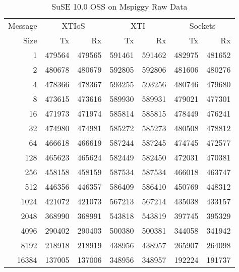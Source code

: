 \documentclass[letterpaper,final,notitlepage,twocolumn,10pt,twoside]{article}
\begin{document}
\begin{appendix}
\begin{table}[hbp]
\footnotesize
\begin{center}
\setlength{\tabcolsep}{0.2em}
\setlength{\arraycolsep}{0.2em}
\begin{tabular}{rrrrrrr}\\
Message & \multicolumn{2}{c}{XTIoS} & \multicolumn{2}{c}{XTI} & \multicolumn{2}{c}{Sockets}\\
Size & Tx & Rx & Tx & Rx & Tx & Rx\\
\hline
\hline
1 & 479564 & 479565 & 591461 & 591462 & 482975 & 481652\\
2 & 480678 & 480679 & 592805 & 592806 & 481606 & 480276\\
4 & 478366 & 478367 & 593255 & 593256 & 480746 & 479680\\
8 & 473615 & 473616 & 589930 & 589931 & 479021 & 477301\\
16 & 471973 & 471974 & 585814 & 585815 & 478449 & 476241\\
32 & 474980 & 474981 & 585272 & 585273 & 480508 & 478812\\
64 & 466618 & 466619 & 587244 & 587245 & 474745 & 472577\\
128 & 465623 & 465624 & 582449 & 582450 & 472031 & 470381\\
256 & 458158 & 458159 & 587534 & 587534 & 466018 & 463747\\
512 & 446356 & 446357 & 586409 & 586410 & 450769 & 448312\\
1024 & 421072 & 421073 & 567213 & 567214 & 435038 & 433157\\
2048 & 368990 & 368991 & 543818 & 543819 & 397745 & 395329\\
4096 & 290402 & 290403 & 500380 & 500381 & 344058 & 341942\\
8192 & 218918 & 218919 & 438956 & 438957 & 265907 & 264098\\
16384 & 137005 & 137006 & 348956 & 348957 & 192224 & 191737\\
\hline
\end{tabular}
\end{center}
\normalsize
\caption[SuSE 10.0 OSS on Mspiggy Raw Data]{SuSE 10.0 OSS on Mspiggy Raw Data}
\label{table:nbdata}
\end{table}

\end{appendix}
\end{document}
